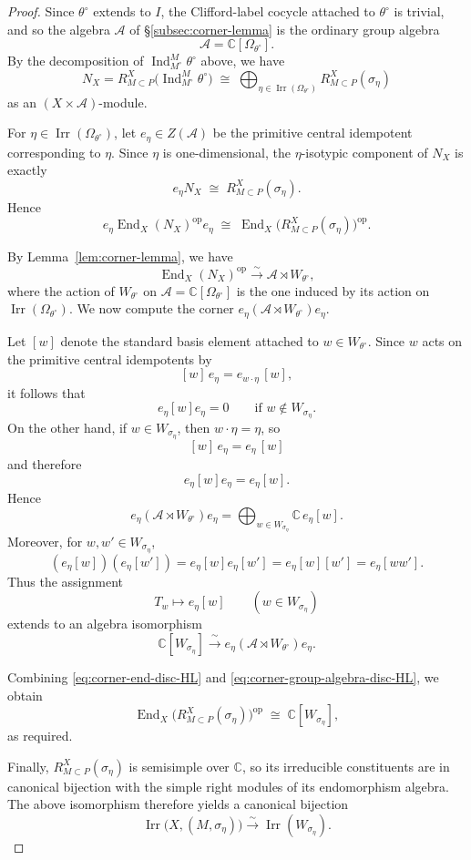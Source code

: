 \documentclass{amsart}
\theoremstyle{plain}
\numberwithin{equation}{section}
\theoremstyle{definition}
\newcommand{\op}{\operatorname{op}}
\newcommand{\Ind}{\operatorname{Ind}}
\newcommand{\End}{\operatorname{End}}
\newcommand{\Irr}{\operatorname{Irr}}
\newcommand{\cA}{\mathcal{A}}
\newcommand{\C}{\mathbb{C}}
\begin{document}
\begin{proof}
Since \(\theta^\circ\) extends to \(I\), the Clifford-label cocycle attached to
\(\theta^\circ\) is trivial, and so the algebra \(\cA\) of
\S\ref{subsec:corner-lemma} is the ordinary group algebra
\[
\cA=\C[\Omega_{\theta^\circ}].
\]
By the decomposition of \(\Ind_{M^\circ}^{M}\theta^\circ\) above, we have
\[
N_X
=
R^X_{M\subset P}\!\bigl(\Ind_{M^\circ}^{M}\theta^\circ\bigr)
\;\cong\;
\bigoplus_{\eta\in \Irr(\Omega_{\theta^\circ})}
R^X_{M\subset P}(\sigma_\eta)
\]
as an \((X\times \cA)\)-module.

For \(\eta\in \Irr(\Omega_{\theta^\circ})\), let \(e_\eta\in Z(\cA)\) be the primitive
central idempotent corresponding to \(\eta\). Since \(\eta\) is one-dimensional, the
\(\eta\)-isotypic component of \(N_X\) is exactly
\[
e_\eta N_X \;\cong\; R^X_{M\subset P}(\sigma_\eta).
\]
Hence
\begin{equation}\label{eq:corner-end-disc-HL}
e_\eta \End_X(N_X)^{\op} e_\eta
\;\cong\;
\End_X\!\bigl(R^X_{M\subset P}(\sigma_\eta)\bigr)^{\op}.
\end{equation}

By Lemma~\ref{lem:corner-lemma}, we have
\[
\End_X(N_X)^{\op}\xrightarrow{\sim} \cA\rtimes W_{\theta^\circ},
\]
where the action of \(W_{\theta^\circ}\) on \(\cA=\C[\Omega_{\theta^\circ}]\) is the one
induced by its action on \(\Irr(\Omega_{\theta^\circ})\).
We now compute the corner \(e_\eta(\cA\rtimes W_{\theta^\circ})e_\eta\).

Let \([w]\) denote the standard basis element attached to \(w\in W_{\theta^\circ}\).
Since \(w\) acts on the primitive central idempotents by
\[
[w]\,e_\eta = e_{w\cdot \eta}\,[w],
\]
it follows that
\[
e_\eta [w] e_\eta = 0
\qquad\text{if } w\notin W_{\sigma_\eta}.
\]
On the other hand, if \(w\in W_{\sigma_\eta}\), then \(w\cdot\eta=\eta\), so
\[
[w]\,e_\eta=e_\eta\,[w]
\]
and therefore
\[
e_\eta [w] e_\eta = e_\eta [w].
\]
Hence
\[
e_\eta(\cA\rtimes W_{\theta^\circ})e_\eta
=
\bigoplus_{w\in W_{\sigma_\eta}} \C\, e_\eta [w].
\]
Moreover, for \(w,w'\in W_{\sigma_\eta}\),
\[
(e_\eta [w])(e_\eta [w'])
=
e_\eta [w] e_\eta [w']
=
e_\eta [w][w']
=
e_\eta [ww'].
\]
Thus the assignment
\[
T_w\longmapsto e_\eta [w]
\qquad (w\in W_{\sigma_\eta})
\]
extends to an algebra isomorphism
\begin{equation}\label{eq:corner-group-algebra-disc-HL}
\C[W_{\sigma_\eta}]
\xrightarrow{\ \sim\ }
e_\eta(\cA\rtimes W_{\theta^\circ})e_\eta.
\end{equation}

Combining \eqref{eq:corner-end-disc-HL} and \eqref{eq:corner-group-algebra-disc-HL},
we obtain
\[
\End_X\!\bigl(R^X_{M\subset P}(\sigma_\eta)\bigr)^{\op}
\;\cong\;
\C[W_{\sigma_\eta}],
\]
as required.

Finally, \(R^X_{M\subset P}(\sigma_\eta)\) is semisimple over \(\C\), so its irreducible
constituents are in canonical bijection with the simple right modules of its
endomorphism algebra. The above isomorphism therefore yields a canonical bijection
\[
\Irr\bigl(X,(M,\sigma_\eta)\bigr)\xrightarrow{\sim}\Irr(W_{\sigma_\eta}).
\]
\end{proof}
\end{document}

